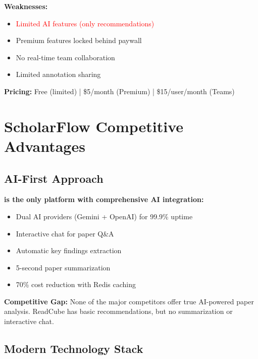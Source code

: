\textbf{Weaknesses:}
\begin{itemize}[leftmargin=*]
    \item \textcolor{red}{Limited AI features (only recommendations)}
    \item Premium features locked behind paywall
    \item No real-time team collaboration
    \item Limited annotation sharing
\end{itemize}

\textbf{Pricing:} Free (limited) | \$5/month (Premium) | \$15/user/month (Teams)

\section{ScholarFlow Competitive Advantages}
\label{sec:competitive-advantages}

\subsection{AI-First Approach}

\begin{successbox}
\textbf{\projectname{} is the only platform with comprehensive AI integration:}
\begin{itemize}
    \item Dual AI providers (Gemini + OpenAI) for 99.9\% uptime
    \item Interactive chat for paper Q\&A
    \item Automatic key findings extraction
    \item 5-second paper summarization
    \item 70\% cost reduction with Redis caching
\end{itemize}

\textbf{Competitive Gap:} None of the major competitors offer true AI-powered paper analysis. ReadCube has basic recommendations, but no summarization or interactive chat.
\end{successbox}

\subsection{Modern Technology Stack}

